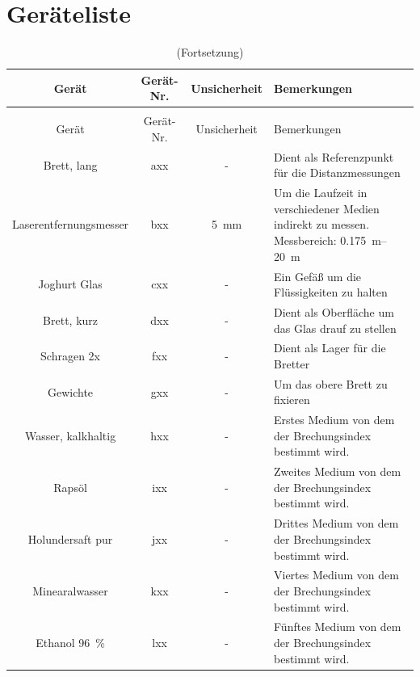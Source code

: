 \documentclass[11pt,ngerman]{scrartcl}
\begin{document}
\section{Geräteliste}
\label{sec:geraeteliste}
\begin{longtable}{c|c|S|p{15em}}
\caption[Geräteliste]{Verwendete Geräte \label{tab:geraeteliste}} \\  %
\toprule
Gerät                              & Gerät-Nr. & { Unsicherheit }  & Bemerkungen \\  
\midrule
\endfirsthead
\caption[]{(Fortsetzung)}\\
\toprule
Gerät                              & Gerät-Nr. & { Unsicherheit }  & Bemerkungen \\                                                                        
\midrule
\endhead
\endfoot
\endlastfoot
        Brett, lang            & axx & { - }       & Dient als Referenzpunkt für die Distanzmessungen\\ \hline
        Laserentfernungsmesser & bxx & \SI{5}{\mm} & Um die Laufzeit in verschiedener Medien indirekt zu messen. Messbereich: \SIrange{0.175}{20}{\meter} \cite{laserdistanzmesser}\\ \hline
        Joghurt Glas           & cxx & { - }       & Ein Gefäß um die Flüssigkeiten zu halten\\ \hline
        Brett, kurz            & dxx & { - }       & Dient als Oberfläche um das Glas drauf zu stellen\\ \hline
        Schragen 2x            & fxx & { - }       & Dient als Lager für die Bretter \\ \hline
        Gewichte               & gxx & { - }       & Um das obere Brett zu fixieren\\ \hline
        Wasser, kalkhaltig     & hxx & { - }       & Erstes Medium von dem der Brechungsindex bestimmt wird.\\ \hline
        Rapsöl                     & ixx & { - }       & Zweites Medium von dem der Brechungsindex bestimmt wird.\\ \hline
        Holundersaft pur      & jxx & { - }       & Drittes Medium von dem der Brechungsindex bestimmt wird.\\ \hline
        Minearalwasser        & kxx & { - }       & Viertes Medium von dem der Brechungsindex bestimmt wird.\\ \hline
        Ethanol \SI{96}{\percent} & lxx & { - } & Fünftes Medium von dem der Brechungsindex bestimmt wird.\\ \hline

        \hline
\end{longtable}
\end{document}
